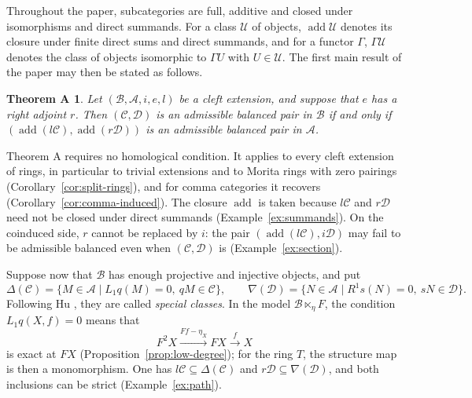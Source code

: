 \documentclass[11pt]{amsart}
\theoremstyle{definition}
\theoremstyle{remark}
\theoremstyle{plain}
\newtheorem*{theoremA}{Theorem A}
\numberwithin{equation}{section}
\begin{document}
Throughout the paper, subcategories are full, additive and closed under
isomorphisms and direct summands. For a class $\mathcal{U}$ of objects,
$\operatorname{add}\mathcal{U}$ denotes its closure under finite direct sums and direct
summands, and for a functor $\Gamma$, $\Gamma\mathcal{U}$ denotes the class of objects
isomorphic to $\Gamma U$ with $U \in \mathcal{U}$. The first main result of the paper may then be stated as follows.

\begin{theoremA}
Let $(\mathcal{B}, \mathcal{A}, i, e, l)$ be a cleft extension, and suppose that $e$ has a right
adjoint $r$. Then $(\mathcal{C}, \mathcal{D})$ is an admissible balanced pair in $\mathcal{B}$ if and
only if $(\operatorname{add}(l\mathcal{C}), \operatorname{add}(r\mathcal{D}))$ is an admissible balanced pair in $\mathcal{A}$.
\end{theoremA}

Theorem A requires no homological condition. It applies to every cleft
extension of rings, in particular to trivial extensions and to Morita
rings with zero pairings (Corollary~\ref{cor:split-rings}), and for comma
categories it recovers \cite[Theorem~2.2]{Mao}
(Corollary~\ref{cor:comma-induced}). The closure $\operatorname{add}$ is taken because
$l\mathcal{C}$ and $r\mathcal{D}$ need not be closed under direct summands
(Example~\ref{ex:summands}). On the coinduced side, $r$ cannot be replaced by
$i$: the pair $(\operatorname{add}(l\mathcal{C}), i\mathcal{D})$ may fail to be admissible balanced
even when $(\mathcal{C}, \mathcal{D})$ is (Example~\ref{ex:section}).

Suppose now that $\mathcal{B}$ has enough projective and
injective objects, and put
\[
 \Delta(\mathcal{C}) = \{M \in \mathcal{A} \mid L_1q(M) = 0, \ qM \in \mathcal{C}\}, \qquad
 \nabla(\mathcal{D}) = \{N \in \mathcal{A} \mid R^1s(N) = 0, \ sN \in \mathcal{D}\}.
\]
Following Hu
\cite[Subsections~3.1 and~3.6]{Hu}, they are called \emph{special classes}. In the model $\mathcal{B} \ltimes_\eta F$, the
condition $L_1q(X, f) = 0$ means that
\[
 F^2X\xrightarrow{Ff-\eta_X}FX\xrightarrow{f}X
\]
is exact at $FX$ (Proposition~\ref{prop:low-degree}); for the ring $T$,
the structure map is then a monomorphism. One has
$l\mathcal{C} \subseteq \Delta(\mathcal{C})$ and $r\mathcal{D} \subseteq \nabla(\mathcal{D})$, and both
inclusions can be strict (Example~\ref{ex:path}).
\end{document}
